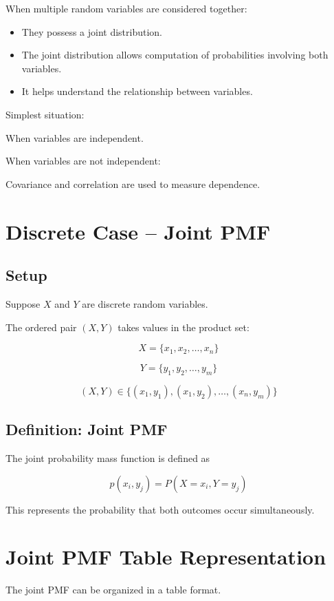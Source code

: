 \documentclass[12pt]{article}
\begin{document}
When multiple random variables are considered together:

\begin{itemize}
\item They possess a joint distribution.
\item The joint distribution allows computation of probabilities involving both variables.
\item It helps understand the relationship between variables.
\end{itemize}

Simplest situation:

When variables are independent.

When variables are not independent:

Covariance and correlation are used to measure dependence.

\section{Discrete Case -- Joint PMF}

\subsection{Setup}

Suppose $X$ and $Y$ are discrete random variables.

The ordered pair $(X,Y)$ takes values in the product set:

\[
X = \{x_1, x_2, \dots, x_n\}
\]

\[
Y = \{y_1, y_2, \dots, y_m\}
\]

\[
(X,Y) \in \{(x_1,y_1),(x_1,y_2),\dots,(x_n,y_m)\}
\]

\subsection{Definition: Joint PMF}

The joint probability mass function is defined as

\[
p(x_i,y_j) = P(X = x_i, Y = y_j)
\]

This represents the probability that both outcomes occur simultaneously.

\section{Joint PMF Table Representation}

The joint PMF can be organized in a table format.
\end{document}
